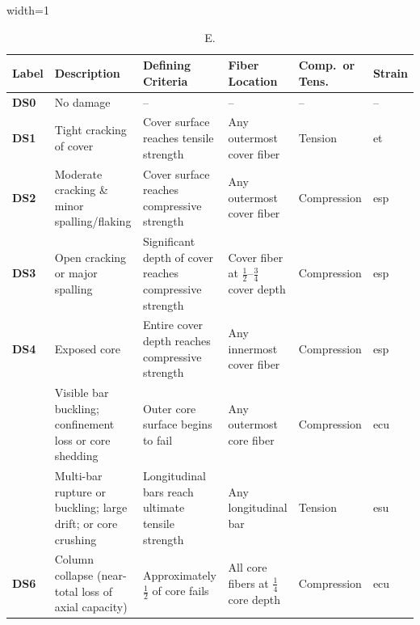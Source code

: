 \begin{table}[H]
\centering
\caption{E.}
\begin{adjustbox}{width=1\textwidth}
\renewcommand{\arraystretch}{1.5}
\begin{tabular}{>{\centering\arraybackslash}m{1.2cm}
                 m{4.2cm}
                 m{5.2cm}
                 m{3.4cm}
                 >{\centering\arraybackslash}m{2.4cm}
                 >{\centering\arraybackslash}m{1.4cm}}
\toprule
\textbf{Label} & \textbf{Description} & \textbf{Defining Criteria} &
\textbf{Fiber Location} & \textbf{Comp.\ or Tens.} & \textbf{Strain} \\
\midrule

\textbf{DS0} & \small No damage & \small -- & \small -- & \small -- & \small -- \\
\textbf{DS1} & \small Tight cracking of cover &
  \small Cover surface reaches tensile strength &
  \small Any outermost cover fiber & \small Tension & \small \gls{et} \\
\textbf{DS2} & \small Moderate cracking \& minor spalling/flaking &
  \small Cover surface reaches compressive strength &
  \small Any outermost cover fiber & \small Compression & \small \gls{esp} \\
\textbf{DS3} & \small Open cracking or major spalling &
  \small Significant depth of cover reaches compressive strength &
  \small Cover fiber at $\tfrac{1}{2}$--$\tfrac{3}{4}$ cover depth & \small Compression & \small \gls{esp} \\
\textbf{DS4} & \small Exposed core &
  \small Entire cover depth reaches compressive strength &
  \small Any innermost cover fiber & \small Compression & \small \gls{esp} \\
\multirow{2}{*}{\textbf{DS5}} &
  \small Visible bar buckling; confinement loss or core shedding &
  \small Outer core surface begins to fail &
  \small Any outermost core fiber & \small Compression & \small \gls{ecu} \\
& \small Multi-bar rupture or buckling; large drift; or core crushing &
  \small Longitudinal bars reach ultimate tensile strength &
  \small Any longitudinal bar & \small Tension & \small \gls{esu} \\
\textbf{DS6} & \small Column collapse (near-total loss of axial capacity) &
  \small Approximately $\tfrac{1}{2}$ of core fails &
  \small All core fibers at $\tfrac{1}{4}$ core depth & \small Compression & \small \gls{ecu} \\
\bottomrule
\end{tabular}
\end{adjustbox}
\label{tab:DS-E}
\end{table}


